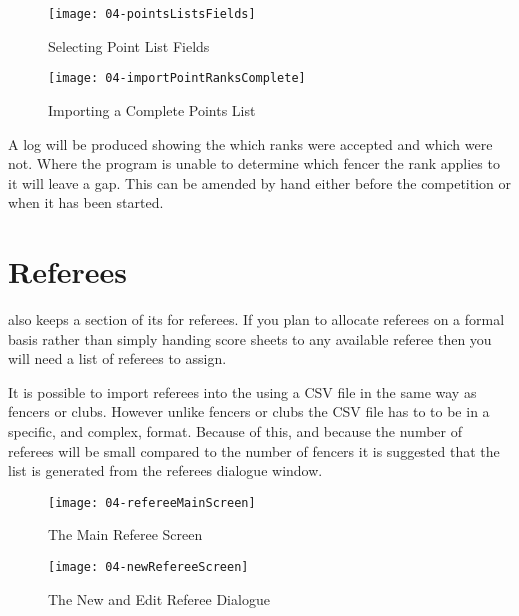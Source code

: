 \documentclass[a4paper,11pt]{memoir}
\begin{document}
\begin{figure}
 \centering
 \begin{minipage}{0.4\textwidth}
 \centering
 \texttt{[image: 04-pointsListsFields]}
 \caption{Selecting Point List Fields} \label{fig:04-pointsListsFields}  
 \end{minipage}
 \hfill
 \begin{minipage}{0.4\textwidth}
 \centering
 \texttt{[image: 04-importPointRanksComplete]}
 \caption{Importing a Complete Points List} \label{fig:04-importPointRanksComplete}    
 \end{minipage}
\end{figure}

A log will be produced showing the which ranks were accepted and which were not. Where the program is unable to determine which fencer the rank applies to it will leave a gap. This can be amended by hand either before the competition or when it has been started. 

\section{Referees}
\fencingtime{} also keeps a section of its  for referees. If you plan to allocate referees on a formal basis rather than simply handing score sheets to any available \gls{referee} then you will need a list of referees to assign.

It is possible to import referees into the  using a CSV file in the same way as fencers or clubs. However unlike fencers or clubs the CSV file has to to be in a specific, and complex, format. Because of this, and because the number of referees will be small compared to the number of fencers it is suggested that the list is generated from the referees dialogue window.

\begin{figure}[!ht]
 \centering
 \begin{minipage}{0.4\textwidth}
 \centering
 \texttt{[image: 04-refereeMainScreen]}
 \caption{The Main Referee Screen} \label{fig:04-refereeMainScreen}  
 \end{minipage}
 \hfill
 \begin{minipage}{0.4\textwidth}
 \centering
 \texttt{[image: 04-newRefereeScreen]}
 \caption{The New and Edit Referee Dialogue} \label{fig:04-newRefereeScreen}    
 \end{minipage}
\end{figure}
\end{document}
